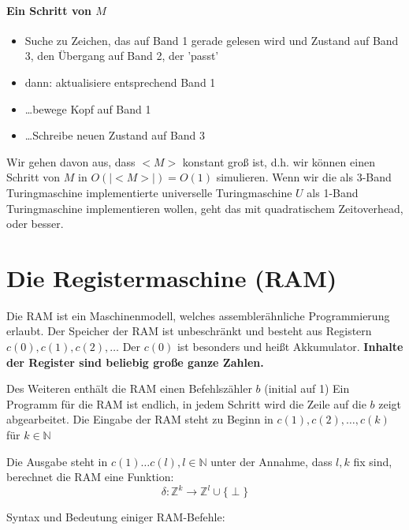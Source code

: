\paragraph*{Ein Schritt von $M$}
\begin{itemize}
	\item Suche zu Zeichen, das auf Band 1 gerade gelesen wird und Zustand auf Band 3, den Übergang auf Band 2, der 'passt'
	\item dann: aktualisiere entsprechend Band 1
	\item \dots bewege Kopf auf Band 1
	\item \dots Schreibe neuen Zustand auf Band 3
\end{itemize}

Wir gehen davon aus, dass $<M>$ konstant groß ist, d.h. wir können einen Schritt von $M$ in $O(|<M>|)=O(1)$ simulieren. Wenn wir die als 3-Band Turingmaschine implementierte universelle Turingmaschine $U$ als 1-Band Turingmaschine implementieren wollen, geht das mit quadratischem Zeitoverhead, oder besser.

\section{Die Registermaschine (RAM)}
Die RAM ist ein Maschinenmodell, welches assemblerähnliche Programmierung erlaubt. Der Speicher der RAM ist unbeschränkt und besteht aus Registern $c(0),c(1),c(2),\dots$ Der $c(0)$ ist besonders und heißt Akkumulator. \textbf{Inhalte der Register sind beliebig große ganze Zahlen.}

\par\medskip
Des Weiteren enthält die RAM einen Befehlszähler $b$ (initial auf 1) %
Ein Programm für die RAM ist endlich, in jedem Schritt wird die Zeile auf die $b$ zeigt abgearbeitet. Die Eingabe der RAM steht zu Beginn in $c(1),c(2),\dots,c(k)$ für $k \in \mathbb{N}$\par\medskip

Die Ausgabe steht in $c(1)\dots c(l), l \in \mathbb{N}$ unter der Annahme, dass $l,k$ fix sind, berechnet die RAM eine Funktion: $$\delta:\mathbb{Z}^k \rightarrow \mathbb{Z}^l \cup \{ \perp \}$$\par\medskip %

\newpage

Syntax und Bedeutung einiger RAM-Befehle:\par\medskip

